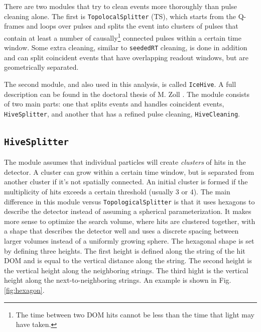 \noindent There are two modules that try to clean events more thoroughly than pulse cleaning alone. The first is \texttt{TopolocalSplitter} (TS), which starts from the Q-frames and loops over pulses and splits the event into clusters of pulses that contain at least a number of causally\footnote{The time between two DOM hits cannot be less than the time that light may have taken.} connected pulses within a certain time window. Some extra cleaning, similar to \texttt{seededRT} cleaning, is done in addition and can split coincident events that have overlapping readout windows, but are geometrically separated.

The second module, and also used in this analysis, is called \texttt{IceHive}. A full description can be found in the doctoral thesis of M. Zoll \cite{mzollthesis}. The module consists of two main parts: one that splits events and handles coincident events, \texttt{HiveSplitter}, and another that has a refined pulse cleaning, \texttt{HiveCleaning}.

\subsection{\texttt{HiveSplitter}}
The module assumes that individual particles will create \textit{clusters} of hits in the detector. A cluster can grow within a certain time window, but is separated from another cluster if it's not spatially connected. An initial cluster is formed if the multiplicity of hits exceeds a certain threshold (usually 3 or 4). The main difference in this module versus \texttt{TopologicalSplitter} is that it uses hexagons to describe the detector instead of assuming a spherical parameterization. It makes more sense to optimize the search volume, where hits are clustered together, with a shape that describes the detector well and uses a discrete spacing between larger volumes instead of a uniformly growing sphere. The hexagonal shape is set by defining three heights. The first height is defined along the string of the hit DOM and is equal to the vertical distance along the string. The second height is the vertical height along the neighboring strings. The third hight is the vertical height along the next-to-neighboring strings. An example is shown in Fig. \ref{fig:hexagon}.

